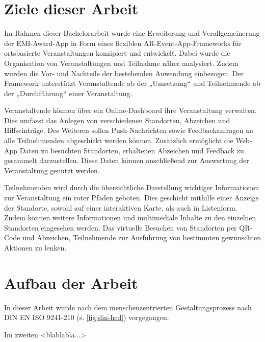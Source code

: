 \section{Ziele dieser Arbeit} \label{sec:goals}

Im Rahmen dieser Bachelorarbeit wurde eine Erweiterung und Verallgemeinerung der
EMI-Award-App in Form eines flexiblen AR-Event-App-Frameworks für ortsbasierte
Veranstaltungen konzipiert und entwickelt. Dabei wurde die Organisation von
Veranstaltungen und Teilnahme näher analysiert. Zudem wurden die Vor- und
Nachteile der bestehenden Anwendung einbezogen. Der Framework unterstützt
Veranstaltende ab der „Umsetzung“ und Teilnehmende ab der „Durchführung“ einer Veranstaltung.

Veranstaltende können über ein Online-Dashboard ihre Veranstaltung verwalten.
Dies umfasst das Anlegen von verschiedenen Standorten, Abzeichen und
Hilfseinträge. Des Weiteren sollen Push-Nachrichten sowie Feedbackanfragen an
alle Teilnehmenden abgeschickt werden können. Zusätzlich ermöglicht die Web-App
Daten zu besuchten Standorten, erhaltenen Abzeichen und Feedback zu gesammelt
darzustellen. Diese Daten können anschließend zur Auswertung der Veranstaltung
genutzt werden.

Teilnehmenden wird durch die übersichtliche Darstellung wichtiger Informationen
zur Veranstaltung ein roter Pfaden geboten. Dies geschieht mithilfe einer
Anzeige der Standorte, sowohl auf einer interaktiven Karte, als auch in
Listenform. Zudem können weitere Informationen und multimediale Inhalte zu den
einzelnen Standorten eingesehen werden. Das virtuelle Besuchen von Standorten
per QR-Code und Abzeichen, Teilnehmende zur Ausführung von bestimmten
gewünschten Aktionen zu lenken.

\section{Aufbau der Arbeit}


In dieser Arbeit wurde nach dem menschenzentrierten Gestaltungsprozess nach DIN
EN ISO 9241-210 (s. \autoref{fig:din-hcd}) vorgegangen.

Im zweiten <blablabla...>

